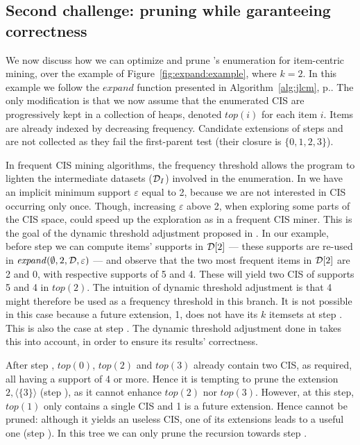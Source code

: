 \subsection{Second challenge: pruning while garanteeing correctness}
\label{sec:toppi:tree}



We now discuss how we can optimize and prune \jlcm's enumeration for item-centric mining,
over the example of Figure~\ref{fig:expand:example}, where $k=2$.
In this example we follow the $\mathit{expand}$ function presented in Algorithm~\ref{alg:jlcm}, p.\pageref{alg:jlcm}.
The only modification is that we now assume that the enumerated CIS are progressively kept in a collection of heaps,
denoted $\mathit{top}(i)$ for each item $i$.
Items are already indexed by decreasing frequency.
Candidate extensions of steps  and  are not collected as they fail the first-parent test
(their closure is $\{0,1,2,3\}$).

In frequent CIS mining algorithms, the frequency threshold allows the program
to lighten the intermediate datasets (${\cal D}_I$) involved in the enumeration.
In \toppi we have an implicit minimum support $\varepsilon$ equal to 2,
because we are not interested in CIS occurring only once.
Though, increasing $\varepsilon$ above 2, when exploring some parts of the CIS space,
could speed up the exploration as in a frequent CIS miner.
This is the goal of the dynamic threshold adjustment proposed in \toppi.
In our example, before step {\scriptsize{}} we can compute items' supports in ${\cal D}[2]$
--- these supports are re-used in $\mathit{expand}(\emptyset, 2, {\cal D}, \varepsilon)$ ---
and observe that the two most frequent items in ${\cal D}[2]$ are 2 and 0, with respective supports of 5 and 4.
These will yield two CIS of supports 5 and 4 in $\mathit{top}(2)$.
The intuition of dynamic threshold adjustment is that 4 might therefore be used as a frequency threshold in this branch.
It is not possible in this case because a future extension, 1,
does not have its $k$ itemsets at step {\scriptsize{}}.
This is also the case at step {\scriptsize{}}.
The dynamic threshold adjustment done in \toppi takes this into account,
in order to ensure its results' correctness.

After step {\scriptsize{}}, $\mathit{top}(0)$, $\mathit{top}(2)$ and $\mathit{top}(3)$
already contain two CIS, as required, all having a support of 4 or more.
Hence it is tempting to prune the extension $2,\langle\{3\}\rangle$ (step {\tiny{}}),
as it cannot enhance $\mathit{top}(2)$ nor $\mathit{top}(3)$.
However, at this step,
$\mathit{top}(1)$ only contains a single CIS and 1 is a future extension.
Hence {\tiny{}} cannot be pruned:
although it yields an useless CIS, one of its extensions leads to a useful one (step {\tiny{}}).
In this tree we can only prune the recursion towards step {\tiny{}}.

